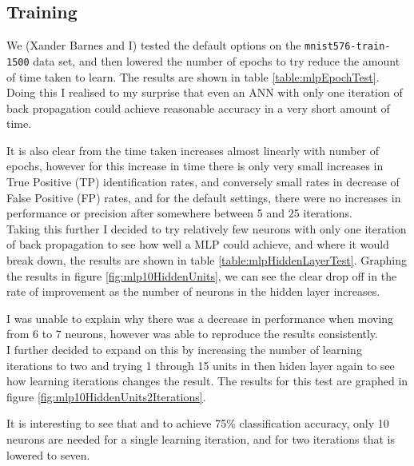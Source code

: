\documentclass[10pt]{article}
\begin{document}
    \subsection{Training}
      \label{sec:2A}
      
      We (Xander Barnes and I) tested the default options on the \texttt{mnist576-train-1500} data set, and then lowered the number of epochs to try reduce the amount of time taken to learn. The results are shown in table \ref{table:mlpEpochTest}. Doing this I realised to my surprise that even an ANN with only one iteration of back propagation could achieve reasonable accuracy in a very short amount of time.

      It is also clear from the time taken increases almost linearly with number of epochs, however for this increase in time there is only very small increases in True Positive (TP) identification rates, and conversely small rates in decrease of False Positive (FP) rates, and for the default settings, there were no increases in performance or precision after somewhere between 5 and 25 iterations.\\

      Taking this further I decided to try relatively few neurons with only one iteration of back propagation to see how well a MLP could achieve, and where it would break down, the results are shown in table \ref{table:mlpHiddenLayerTest}. Graphing the results in figure \ref{fig:mlp10HiddenUnits}, we can see the clear drop off in the rate of improvement as the number of neurons in the hidden layer increases.

      I was unable to explain why there was a decrease in performance when moving from 6 to 7 neurons, however was able to reproduce the results consistently.\\

      I further decided to expand on this by increasing the number of learning iterations to two and trying 1 through 15 units in then hiden layer again to see how learning iterations changes the result. The results for this test are graphed in figure \ref{fig:mlp10HiddenUnits2Iterations}.

      It is interesting to see that and to achieve 75\% classification accuracy, only 10 neurons are needed for a single learning iteration, and for two iterations that is lowered to seven. \\
\end{document}
